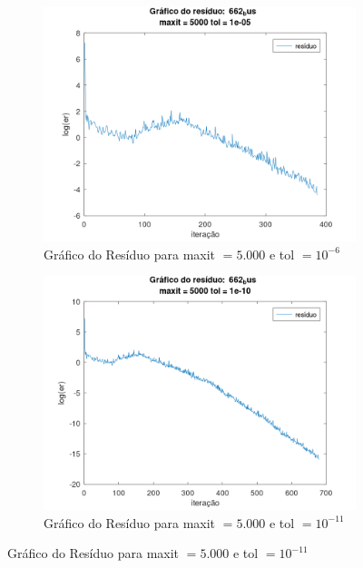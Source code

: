 \begin{figure}[H]
    \centering
    \begin{subfigure}[t]{0.4\linewidth}
         \centering
         \includegraphics[width=\textwidth]{image/662_bus_5000_-6.png}
         \caption{Gráfico do Resíduo para maxit $= 5.000$ e tol $=10^{-6}$}
         \label{fig:bus-5-6}
    \end{subfigure}
    \quad
    \begin{subfigure}[t]{0.4\linewidth}
         \centering
         \includegraphics[width=\textwidth]{image/662_bus_5000_-11.png}
         \caption{Gráfico do Resíduo para maxit $= 5.000$ e tol $=10^{-11}$}
         \label{fig:bus-5-11}
    \end{subfigure}

\end{figure}

